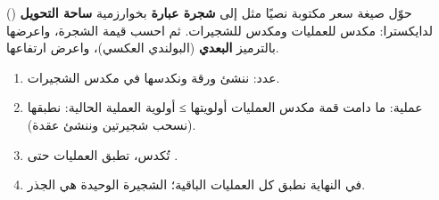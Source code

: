 \begin{statement}
حوّل صيغة سعر مكتوبة نصيًا مثل  إلى \textbf{شجرة عبارة} بخوارزمية \textbf{ساحة التحويل} () لدايكسترا: مكدس للعمليات ومكدس للشجيرات. ثم احسب قيمة الشجرة، واعرضها بالترميز \textbf{البعدي} (البولندي العكسي)، واعرض ارتفاعها.
\end{statement}
\begin{stepsbox}\begin{enumerate}
\item عدد: ننشئ ورقة ونكدسها في مكدس الشجيرات.
\item عملية: ما دامت قمة مكدس العمليات أولويتها ≥ أولوية العملية الحالية: نطبقها (نسحب شجيرتين وننشئ عقدة).
\item \code{(} تُكدس، \code{)} تطبق العمليات حتى \code{(}.
\item في النهاية نطبق كل العمليات الباقية؛ الشجيرة الوحيدة هي الجذر.
\end{enumerate}\end{stepsbox}
